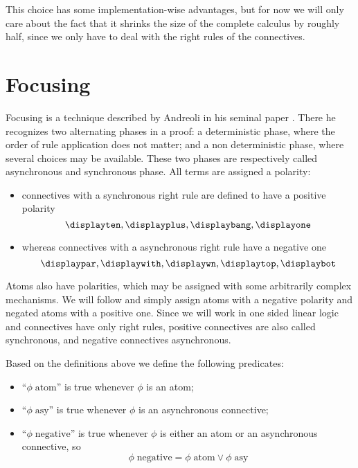 This choice has some implementation-wise advantages, but for now we will only care about the fact that it shrinks the size of the complete calculus by roughly half, since we only have to deal with the right rules of the connectives.

\section{Focusing}
Focusing is a technique described by Andreoli in his seminal paper \cite{Focusing}.
There he recognizes two alternating phases in a proof: a deterministic phase, where the order of rule application does not matter; and a non deterministic phase, where several choices may be available.
These two phases are respectively called asynchronous and synchronous phase.
All terms are assigned a polarity: 
\begin{itemize}
	\item connectives with a synchronous right rule are defined to have a positive polarity
		$$ \displayten, \displayplus, \displaybang, \displayone$$
	\item whereas connectives with a asynchronous right rule have a negative one
		$$ \displaypar, \displaywith, \displaywn, \displaytop, \displaybot$$
\end{itemize}
Atoms also have polarities, which may be assigned with some arbitrarily complex mechanisms.
We will follow \cite{LiangMiller} and simply assign atoms with a negative polarity and negated atoms with a positive one.
Since we will work in one sided linear logic and connectives have only right rules, positive connectives are also called synchronous, and negative connectives asynchronous.
\begin{define}
	Based on the definitions above we define the following predicates:
	\begin{itemize}
		\item ``$\phi \; \mathrm{atom}$'' is true whenever $\phi$ is an atom;
		\item ``$\phi \; \mathrm{asy}$'' is true whenever $\phi$ is an asynchronous connective;
		\item ``$\phi \; \mathrm{negative}$'' is true whenever $\phi$ is either an atom or an asynchronous connective, so
			$$ \phi \; \mathrm{negative} = \phi \; \mathrm{atom} \vee \phi \; \mathrm{asy} $$
	\end{itemize}
\end{define}

